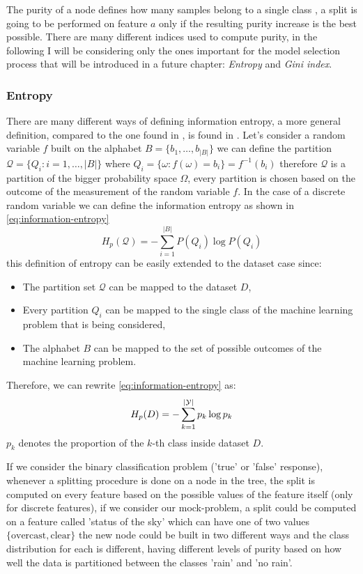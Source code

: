 \medskip

The purity of a node defines how many samples belong to a single class \cite{ZhouZhi-Hua2021ML}, a
split is going to be performed on feature $a$ only if the resulting purity increase is the best
possible. There are many different indices used to compute purity, in the following I will be
considering only the ones important for the model selection process that will be introduced in
a future chapter: \emph{Entropy} and \emph{Gini index}.

\subsubsection{Entropy}
There are many different ways of defining information entropy, a more general definition, compared
to the one found in \cite{ZhouZhi-Hua2021ML}, is found in \cite{gray2011entropy}. Let's consider a
random variable $f$ built on the alphabet $B = \{b_1, \ldots, b_{|B|}\}$ we can define the
partition $\mathcal{Q} = \{Q_i: i = 1, \ldots, |B|\}$ where $Q_i = \{\omega: f(\omega) = b_i\} = f^{-1}(b_i)$ therefore $\mathcal{Q}$ is a partition of the bigger
probability space $\Omega$, every partition is chosen based on the outcome of the
measurement of the random variable $f$. In the case of a discrete random variable we can define the
information entropy as shown in \cref{eq:information-entropy}
\begin{equation}
	\label{eq:information-entropy}
	H_p(\mathcal{Q}) = - \sum_{i = 1}^{|B|}{P(Q_i)\log{P(Q_i)}}
\end{equation}
this definition of entropy can be easily extended to the dataset case since:
\begin{itemize}
	\item The partition set $\mathcal{Q}$ can be mapped to the dataset $D$,
	\item Every partition $Q_i$ can be mapped to the single class of the machine learning
	      problem that is being considered,
	\item The alphabet $B$ can be mapped to the set of possible outcomes of the machine learning
	      problem.
\end{itemize}
Therefore, we can rewrite \cref{eq:information-entropy} as:
\begin{equation}
	H_p(D) = - \sum_{k = 1}^{|\mathcal{Y}|}p_k \log{p_k}
\end{equation}
$p_k$ denotes the proportion of the $k$-th class inside dataset $D$.

If we consider the binary classification problem ('true' or 'false' response), whenever a splitting procedure
is done on a node in the tree, the split is computed on every feature based on the possible
values of the feature itself (only for discrete features), if we consider our mock-problem, a split could be computed on a
feature called  'status of the sky' which can have one of two values $\{\text{overcast},
	\text{clear}\}$ the new node could be built in two different ways and
the class distribution for each is different, having different levels of purity based
on how well the data is partitioned between the classes 'rain' and 'no rain'.

